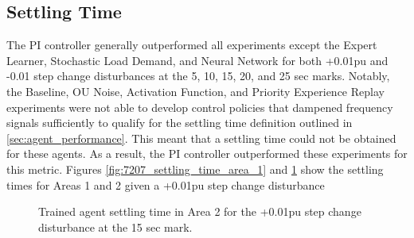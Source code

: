 \subsection{Settling Time}
The PI controller generally outperformed all experiments except the Expert Learner, Stochastic Load Demand, and Neural Network for both +0.01pu and -0.01 step change disturbances at the 5, 10, 15, 20, and 25 sec marks. Notably, the Baseline, OU Noise, Activation Function, and Priority Experience Replay experiments were not able to develop control policies that dampened frequency signals sufficiently to qualify for the settling time definition outlined in \textsection \ref{sec:agent_performance}. This meant that a settling time could not be obtained for these agents. As a result, the PI controller outperformed these experiments for this metric. Figures \ref{fig:7207_settling_time_area_1} and \ref{fig:7208_settling_time_area_2} show the settling times for Areas 1 and 2 given a +0.01pu step change disturbance 



\begin{figure}[h]
	\begin{minipage}[t]{0.50\textwidth}
		\centering
		\resizebox{7cm}{!}{}
		\caption{Trained agent settling time in Area 1 for the +0.01pu step change disturbance at the 15 sec mark.}\label{fig:7207_settling_time_area_1}
	\end{minipage}
	\hspace{0.25cm}
	\begin{minipage}[t]{0.50\textwidth}
		\resizebox{7cm}{!}{}
		\caption{Trained agent settling time in Area 2 for the +0.01pu step change disturbance at the 15 sec mark.}\label{fig:7208_settling_time_area_2}
	\end{minipage}
\end{figure}



